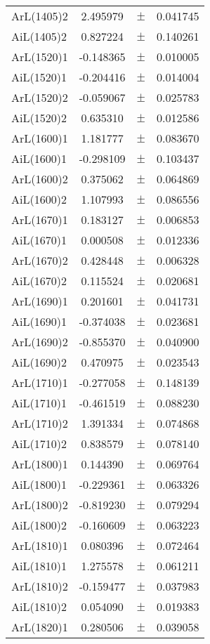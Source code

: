 \begin{table}
\begin{tiny}
\begin{tabular}{lccc}
ArL(1405)2 & 2.495979 & $\pm$ & 0.041745 \\
AiL(1405)2 & 0.827224 & $\pm$ & 0.140261 \\
ArL(1520)1 & -0.148365 & $\pm$ & 0.010005 \\
AiL(1520)1 & -0.204416 & $\pm$ & 0.014004 \\
ArL(1520)2 & -0.059067 & $\pm$ & 0.025783 \\
AiL(1520)2 & 0.635310 & $\pm$ & 0.012586 \\
ArL(1600)1 & 1.181777 & $\pm$ & 0.083670 \\
AiL(1600)1 & -0.298109 & $\pm$ & 0.103437 \\
ArL(1600)2 & 0.375062 & $\pm$ & 0.064869 \\
AiL(1600)2 & 1.107993 & $\pm$ & 0.086556 \\
ArL(1670)1 & 0.183127 & $\pm$ & 0.006853 \\
AiL(1670)1 & 0.000508 & $\pm$ & 0.012336 \\
ArL(1670)2 & 0.428448 & $\pm$ & 0.006328 \\
AiL(1670)2 & 0.115524 & $\pm$ & 0.020681 \\
ArL(1690)1 & 0.201601 & $\pm$ & 0.041731 \\
AiL(1690)1 & -0.374038 & $\pm$ & 0.023681 \\
ArL(1690)2 & -0.855370 & $\pm$ & 0.040900 \\
AiL(1690)2 & 0.470975 & $\pm$ & 0.023543 \\
ArL(1710)1 & -0.277058 & $\pm$ & 0.148139 \\
AiL(1710)1 & -0.461519 & $\pm$ & 0.088230 \\
ArL(1710)2 & 1.391334 & $\pm$ & 0.074868 \\
AiL(1710)2 & 0.838579 & $\pm$ & 0.078140 \\
ArL(1800)1 & 0.144390 & $\pm$ & 0.069764 \\
AiL(1800)1 & -0.229361 & $\pm$ & 0.063326 \\
ArL(1800)2 & -0.819230 & $\pm$ & 0.079294 \\
AiL(1800)2 & -0.160609 & $\pm$ & 0.063223 \\
ArL(1810)1 & 0.080396 & $\pm$ & 0.072464 \\
AiL(1810)1 & 1.275578 & $\pm$ & 0.061211 \\
ArL(1810)2 & -0.159477 & $\pm$ & 0.037983 \\
AiL(1810)2 & 0.054090 & $\pm$ & 0.019383 \\
ArL(1820)1 & 0.280506 & $\pm$ & 0.039058 \\

\end{tabular}
\end{tiny}
\end{table}
